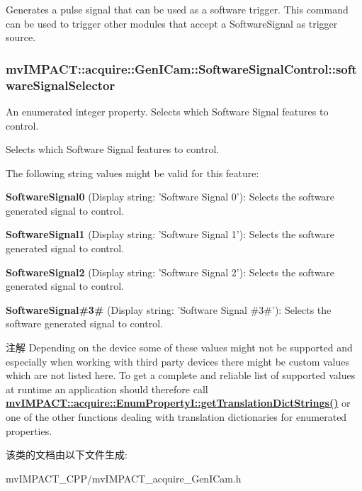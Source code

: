 Generates a pulse signal that can be used as a software trigger. This command can be used to trigger other modules that accept a Software\+Signal as trigger source. \hypertarget{classmv_i_m_p_a_c_t_1_1acquire_1_1_gen_i_cam_1_1_software_signal_control_a99efd63a4cd4ac8f175a3dce479095fc}{
\subsubsection[{software\+Signal\+Selector}]{ mv\+I\+M\+P\+A\+C\+T\+::acquire\+::\+Gen\+I\+Cam\+::\+Software\+Signal\+Control\+::software\+Signal\+Selector}}\label{classmv_i_m_p_a_c_t_1_1acquire_1_1_gen_i_cam_1_1_software_signal_control_a99efd63a4cd4ac8f175a3dce479095fc}


An enumerated integer property. Selects which Software Signal features to control. 

Selects which Software Signal features to control.

The following string values might be valid for this feature\+:
\begin{DoxyItemize}
\item {\bfseries Software\+Signal0} (Display string\+: 'Software Signal 0')\+: Selects the software generated signal to control.
\item {\bfseries Software\+Signal1} (Display string\+: 'Software Signal 1')\+: Selects the software generated signal to control.
\item {\bfseries Software\+Signal2} (Display string\+: 'Software Signal 2')\+: Selects the software generated signal to control.
\item {\bfseries Software\+Signal\#3\#} (Display string\+: 'Software Signal \#3\#')\+: Selects the software generated signal to control.
\end{DoxyItemize}

\begin{DoxyNote}{注解}
Depending on the device some of these values might not be supported and especially when working with third party devices there might be custom values which are not listed here. To get a complete and reliable list of supported values at runtime an application should therefore call {\bfseries \hyperlink{classmv_i_m_p_a_c_t_1_1acquire_1_1_enum_property_i_a0ba6ccbf5ee69784d5d0b537924d26b6}{mv\+I\+M\+P\+A\+C\+T\+::acquire\+::\+Enum\+Property\+I\+::get\+Translation\+Dict\+Strings()}} or one of the other functions dealing with translation dictionaries for enumerated properties. 
\end{DoxyNote}


该类的文档由以下文件生成\+:\begin{DoxyCompactItemize}
\item 
mv\+I\+M\+P\+A\+C\+T\+\_\+\+C\+P\+P/mv\+I\+M\+P\+A\+C\+T\+\_\+acquire\+\_\+\+Gen\+I\+Cam.\+h\end{DoxyCompactItemize}
